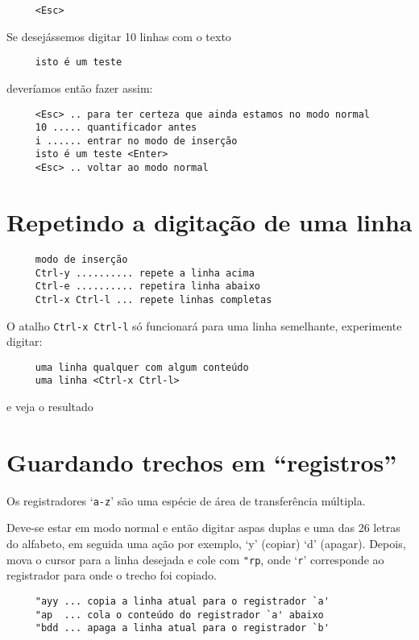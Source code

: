 \begin{verbatim}
     <Esc>
\end{verbatim}

Se desejássemos digitar 10 linhas com o texto

\begin{verbatim}
     isto é um teste
\end{verbatim}

deveríamos então fazer assim:
   
\begin{verbatim}
     <Esc> .. para ter certeza que ainda estamos no modo normal
     10 ..... quantificador antes
     i ...... entrar no modo de inserção
     isto é um teste <Enter>
     <Esc> .. voltar ao modo normal
\end{verbatim}

\section{Repetindo a digitação de uma linha }

\begin{verbatim}
     modo de inserção
     Ctrl-y .......... repete a linha acima 
     Ctrl-e .......... repetira linha abaixo 
     Ctrl-x Ctrl-l ... repete linhas completas
\end{verbatim}


O atalho {\tt Ctrl-x Ctrl-l} só funcionará para uma 
linha semelhante, experimente digitar:

\begin{verbatim}
     uma linha qualquer com algum conteúdo
     uma linha <Ctrl-x Ctrl-l>
\end{verbatim}

e veja o resultado

\section{Guardando trechos em ``registros''}
\label{sec:Guardando trechos em ``registros''}

Os registradores `{\tt a-z}' são uma espécie de área de transferência múltipla.

Deve-se estar em modo normal e então digitar aspas duplas e uma
das 26 letras do alfabeto, em seguida uma ação por exemplo, `y'
(copiar) `d' (apagar). Depois, mova o cursor para a linha
desejada e cole com \verb+"rp+, onde `{\tt r}' corresponde ao
registrador para onde o trecho foi copiado.

\begin{verbatim}
     "ayy ... copia a linha atual para o registrador `a'
     "ap  ... cola o conteúdo do registrador `a' abaixo
     "bdd ... apaga a linha atual para o registrador `b'
\end{verbatim}

